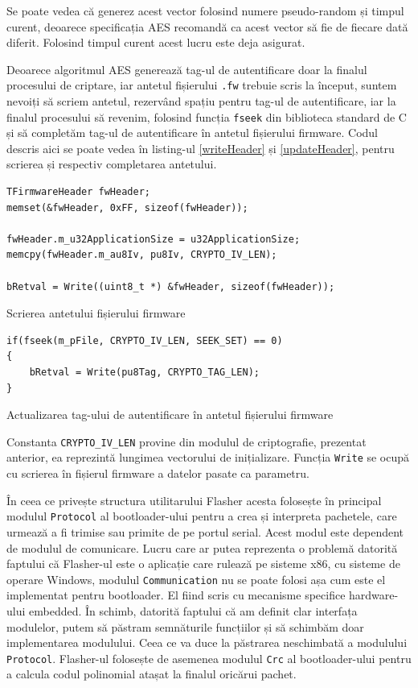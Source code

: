 \documentclass[12pt,a4paper,titlepage]{report}
\begin{document}
Se poate vedea că generez acest vector folosind numere pseudo-random și timpul curent, deoarece specificația AES recomandă ca acest vector să fie de fiecare dată diferit. Folosind timpul curent acest lucru este deja asigurat.

Deoarece algoritmul AES generează tag-ul de autentificare doar la finalul procesului de criptare, iar antetul fișierului \texttt{.fw} trebuie scris la început, suntem nevoiți să scriem antetul, rezervând spațiu pentru tag-ul de autentificare, iar la finalul procesului să revenim, folosind funcția \texttt{fseek} din biblioteca standard de C și să completăm tag-ul de autentificare în antetul fișierului firmware. Codul descris aici se poate vedea în listing-ul \ref{writeHeader} și \ref{updateHeader}, pentru scrierea și respectiv completarea antetului.

\begin{listing}[h]
\begin{verbatim}
TFirmwareHeader fwHeader;
memset(&fwHeader, 0xFF, sizeof(fwHeader));

fwHeader.m_u32ApplicationSize = u32ApplicationSize;
memcpy(fwHeader.m_au8Iv, pu8Iv, CRYPTO_IV_LEN);

bRetval = Write((uint8_t *) &fwHeader, sizeof(fwHeader));
\end{verbatim}

\caption{Scrierea antetului fișierului firmware}
\label{writeHeader}
\end{listing}

\begin{listing}[h]
\begin{verbatim}
if(fseek(m_pFile, CRYPTO_IV_LEN, SEEK_SET) == 0)
{
    bRetval = Write(pu8Tag, CRYPTO_TAG_LEN);
}
\end{verbatim}

\caption{Actualizarea tag-ului de autentificare în antetul fișierului firmware}
\label{updateHeader}
\end{listing}

Constanta \texttt{CRYPTO\_IV\_LEN} provine din modulul de criptografie, prezentat anterior, ea reprezintă lungimea vectorului de inițializare. Funcția \texttt{Write} se ocupă cu scrierea în fișierul firmware a datelor pasate ca parametru.

În ceea ce privește structura utilitarului Flasher acesta folosește în principal modulul \texttt{Protocol} al bootloader-ului pentru a crea și interpreta pachetele, care urmează a fi trimise sau primite de pe portul serial. Acest modul este dependent de modulul de comunicare. Lucru care ar putea reprezenta o problemă datorită faptului că Flasher-ul este o aplicație care rulează pe sisteme x86, cu sisteme de operare Windows, modulul \texttt{Communication} nu se poate folosi așa cum este el implementat pentru bootloader. El fiind scris cu mecanisme specifice hardware-ului embedded. În schimb, datorită faptului că am definit clar interfața modulelor, putem să păstram semnăturile funcțiilor și să schimbăm doar implementarea modulului. Ceea ce va duce la păstrarea neschimbată a modulului \texttt{Protocol}.
Flasher-ul folosește de asemenea modulul \texttt{Crc} al bootloader-ului pentru a calcula codul polinomial atașat la finalul oricărui pachet.
\end{document}
